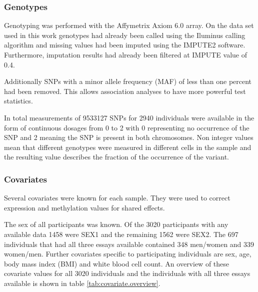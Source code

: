 \documentclass[a4paper,12pt,twoside,openright]{article}
\begin{document}
 
\subsubsection{Genotypes}
\label{Data:Genotypes}
Genotyping was performed with the Affymetrix Axiom 6.0 array. On the data set used in this work genotypes had already been called using the Iluminus calling algorithm and missing values had been imputed using the IMPUTE2 software\cite{10.1371/journal.pgen.1000529}. Furthermore, imputation results had already been filtered at IMPUTE value of 0.4.  

Additionally SNPs with a minor allele frequency (MAF) of less than one percent had been removed. This allows association analyses to have more powerful test statistics.

In total measurements of 9533127 SNPs for 2940 individuals were available in the form of continuous dosages from 0 to 2 with 0 representing no occurrence of the SNP and 2 meaning the SNP is present in both chromosomes. Non integer values mean that different genotypes were measured in different cells in the sample and the resulting value describes the fraction of the occurrence of the variant. 

\subsubsection{Covariates}
\label{Data:Covariates}
Several covariates were known for each sample. They were used to correct expression and methylation values for shared effects. 

The sex of all participants was known. Of the 3020 participants with any available data 1458 were SEX1 and the remaining 1562 were SEX2. The 697 individuals that had all three essays available contained 348 men/women and 339 women/men.
Further covariates specific to participating individuals are sex, age, body mass index (BMI) and white blood cell count. An overview of these covariate values for all 3020 individuals and the individuals with all three essays available is shown in table \ref{tab:covariate.overview}.
\end{document}
